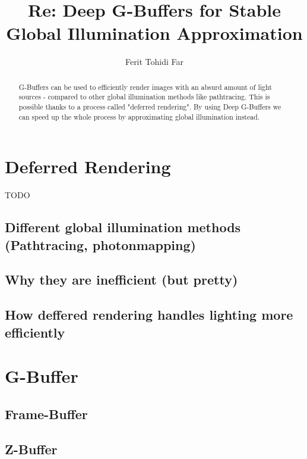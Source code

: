 \documentclass{ACGSeminar}
\begin{document}
\title{Re: Deep G-Buffers for Stable Global Illumination Approximation}

\author{Ferit Tohidi Far}

\maketitle


\begin{abstract}%
G-Buffers can be used to efficiently render images with an absurd amount of light sources - compared to other global illumination methods like pathtracing. This is possible thanks to a process called "deferred rendering". By using Deep G-Buffers we can speed up the whole process by approximating global illumination instead.
\end{abstract}

\tableofcontents

\newpage

\label{cha:introduction}
\section{Deferred Rendering}
TODO
	\subsection{Different global illumination methods (Pathtracing, photonmapping)}
	\subsection{Why they are inefficient (but pretty)}
	\subsection{How deffered rendering handles lighting more efficiently}

\section{G-Buffer}
	\subsection{Frame-Buffer}
	\subsection{Z-Buffer}
\end{document}
